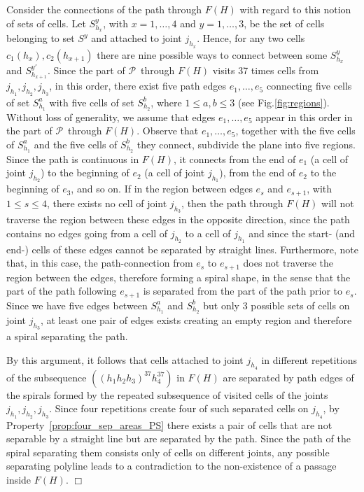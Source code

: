 \documentclass[a4paper,10pt]{llncs}
\newcounter{prop}
\renewenvironment{proof}
{{\bf Proof:}}{\hspace*{\fill}$\Box$\par\vspace{2mm}}
\renewcommand{\P}{\mbox{$\mathcal P$ }}
\begin{document}
\begin{proof}
Consider the connections of the path through $F(H)$ with regard to this notion of sets of cells.
Let $S_{h_x}^y$, with $x=1,\dots,4$ and $y=1,\dots,3$, be the set of cells belonging to set $S^y$ and attached to joint $j_{h_x}$. Hence, for any two cells $c_1(h_x),c_2(h_{x+1})$ there are nine possible ways to connect between some $S_{h_x}^y$ and $S_{h_{x+1}}^{y'}$.
Since the part of \P through $F(H)$ visits 37 times cells from $j_{h_1}, j_{h_2}, j_{h_3}$, in this order, there exist five path edges $e_1,\ldots ,e_5$ connecting five cells of set $S_{h_1}^a$ with five cells of set $S_{h_2}^b$, where $1\leq a,b \leq 3$ (see Fig.\ref{fig:regions}). Without loss of generality, we assume that edges $e_1,\ldots ,e_5$ appear in this order in the part of \P through $F(H)$. Observe that $e_1,\ldots ,e_5$, together with the five cells of $S_{h_1}^a$ and the five cells of $S_{h_2}^b$ they connect, subdivide the plane into five regions. Since the path is continuous in $F(H)$, it connects from the end of $e_1$ (a cell of joint $j_{h_2}$) to the beginning of $e_2$ (a cell of joint $j_{h_1}$), from the end of $e_2$ to the beginning of $e_3$, and so on. If in the region between edges $e_s$ and $e_{s+1}$, with $1\leq s \leq 4$, there exists no cell of joint $j_{h_3}$, then the path through $F(H)$ will not traverse the region between these edges in the opposite direction, since the path contains no edges going from a cell of $j_{h_2}$ to a cell of $j_{h_1}$ and since the start- (and end-) cells of these edges cannot be separated by straight lines.
Furthermore, note that, in this case, the path-connection from $e_s$ to $e_{s+1}$ does not traverse the region between the edges, therefore forming a spiral shape, in the sense that the part of the path following $e_{s+1}$ is separated from the part of the path prior to $e_s$.
Since we have five edges between $S_{h_1}^a$ and $S_{h_2}^b$ but only 3 possible sets of cells on joint $j_{h_3}$, at least one pair of edges exists creating an empty region and therefore a spiral separating the path.

By this argument, it follows that cells attached to joint $j_{h_4}$ in different repetitions of the subsequence $((h_1h_2h_3)^{37}h_4^{37})$ in $F(H)$ are separated by path edges of the spirals formed by the repeated subsequence of visited cells of the joints $j_{h_1}, j_{h_2} , j_{h_3}$. Since four repetitions create four of such separated cells on $j_{h_4}$, by Property~\ref{prop:four_sep_areas_PS} there exists a pair of cells that are not separable by a straight line but are separated by the path. Since the path of the spiral separating them consists only of cells on different joints, any possible separating polyline leads to a contradiction to the non-existence of a passage inside $F(H)$.
\end{proof}
\end{document}
